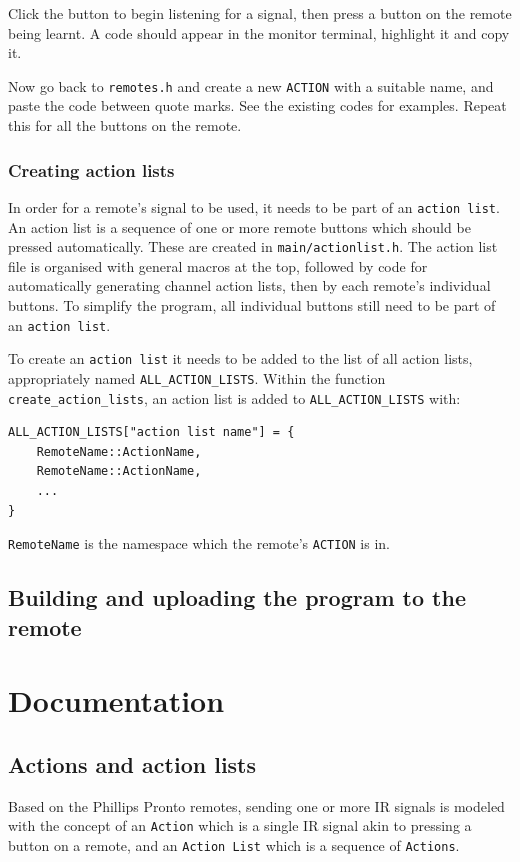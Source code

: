 \documentclass{article}
\begin{document}
Click the button to begin listening for a signal, then press a button on the remote being learnt. A code should appear
in the monitor terminal, highlight it and copy it.

Now go back to \verb|remotes.h| and create a new \verb|ACTION| with a suitable name, and paste the code between quote
marks. See the existing codes for examples. Repeat this for all the buttons on the remote.

\subsubsection{Creating action lists}
In order for a remote's signal to be used, it needs to be part of an \verb|action list|. An action list is a sequence of
one or more remote buttons which should be pressed automatically. These are created in \verb|main/actionlist.h|. The
action list file is organised with general macros at the top, followed by code for automatically generating channel
action lists, then by each remote's individual buttons. To simplify the program, all individual buttons still need to be
part of an \verb|action list|.

To create an \verb|action list| it needs to be added to the list of all action lists, appropriately named
\verb|ALL_ACTION_LISTS|. Within the function \verb|create_action_lists|, an action list is added to
\verb|ALL_ACTION_LISTS| with:
\begin{verbatim}
ALL_ACTION_LISTS["action list name"] = {
    RemoteName::ActionName,
    RemoteName::ActionName,
    ...
}
\end{verbatim}

\verb|RemoteName| is the namespace which the remote's \verb|ACTION| is in. 


\subsection{Building and uploading the program to the remote}\label{secBuilding}


\section{Documentation}
\subsection{Actions and action lists}
Based on the Phillips Pronto remotes, sending one or more IR signals is modeled with the concept of an \verb|Action|
which is a single IR signal akin to pressing a button on a remote, and an \verb|Action List| which is a sequence of
\verb|Actions|.
\end{document}
